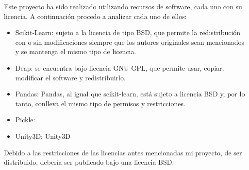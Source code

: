 Este proyecto ha sido realizado utilizando recursos de software, cada uno con su licencia. A continuación procedo a analizar cada uno de ellos:
\begin{itemize}
    \item Scikit-Learn: sujeto a la licencia de tipo BSD, que permite la redistribución con o sin modificaciones siempre que los autores originales sean mencionados y se mantenga el mismo tipo de licencia.
    \item Deap: se encuentra bajo licencia GNU GPL, que permite usar, copiar, modificar el software y redistribuirlo.
    \item Pandas: Pandas, al igual que scikit-learn, está sujeto a licencia BSD y, por lo tanto, conlleva el mismo tipo de permisos y restricciones.
    \item Pickle: 
    \item Unity3D: Unity3D 
\end{itemize}


Debido a las restricciones de las licencias antes mencionadas mi proyecto, de ser distribuido, debería ser publicado bajo una licencia BSD.